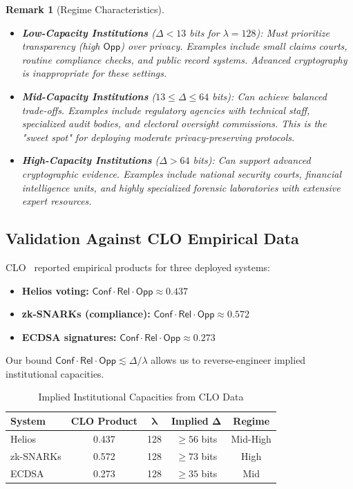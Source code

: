 \documentclass{ieeeaccess}
\newcommand{\Conf}{\mathsf{Conf}}
\newcommand{\Rel}{\mathsf{Rel}}
\newcommand{\Opp}{\mathsf{Opp}}
\newtheorem{remark}{Remark}[subsection]
\begin{document}
\begin{remark}[Regime Characteristics]
\begin{itemize}
\item \textbf{Low-Capacity Institutions} ($\Delta < 13$ bits for $\lambda=128$): Must prioritize transparency (high $\Opp$) over privacy. Examples include small claims courts, routine compliance checks, and public record systems. Advanced cryptography is inappropriate for these settings.

\item \textbf{Mid-Capacity Institutions} ($13 \leq \Delta \leq 64$ bits): Can achieve balanced trade-offs. Examples include regulatory agencies with technical staff, specialized audit bodies, and electoral oversight commissions. This is the "sweet spot" for deploying moderate privacy-preserving protocols.

\item \textbf{High-Capacity Institutions} ($\Delta > 64$ bits): Can support advanced cryptographic evidence. Examples include national security courts, financial intelligence units, and highly specialized forensic laboratories with extensive expert resources.
\end{itemize}
\end{remark}

\subsection{Validation Against CLO Empirical Data}\label{subsec:clo_interpretation}

CLO~\cite{Minka2026CLO} reported empirical products for three deployed systems:
\begin{itemize}
\item \textbf{Helios voting:} $\Conf \cdot \Rel \cdot \Opp \approx 0.437$
\item \textbf{zk-SNARKs (compliance):} $\Conf \cdot \Rel \cdot \Opp \approx 0.572$
\item \textbf{ECDSA signatures:} $\Conf \cdot \Rel \cdot \Opp \approx 0.273$
\end{itemize}

Our bound $\Conf \cdot \Rel \cdot \Opp \lesssim \Delta/\lambda$ allows us to reverse-engineer implied institutional capacities.

\begin{table}[htbp]
\centering
\caption{Implied Institutional Capacities from CLO Data}
\begin{tabular}{lcccc}
\toprule
\textbf{System} & \textbf{CLO Product} & $\boldsymbol{\lambda}$ & \textbf{Implied} $\boldsymbol{\Delta}$ & \textbf{Regime} \\
\midrule
Helios          & 0.437               & 128                & $\geq 56$ bits           & Mid-High \\
zk-SNARKs       & 0.572               & 128                & $\geq 73$ bits           & High \\
ECDSA           & 0.273               & 128                & $\geq 35$ bits           & Mid \\
\bottomrule
\end{tabular}
\label{tab:clo_validation}
\end{table}
\end{document}
